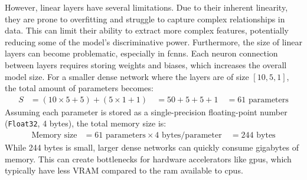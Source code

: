 However, linear layers have several limitations. Due to their inherent linearity, they are prone to overfitting and struggle to capture complex relationships in data. This can limit their ability to extract more complex features, potentially reducing some of the model's discriminative power. Furthermore, the size of linear layers can become problematic, especially in \acrshort{fcnn}s. Each neuron connection between layers requires storing weights and biases, which increases the overall model size. For a smaller dense network where the layers are of size $[10, 5, 1]$, the total amount of parameters becomes:
$$\begin{aligned}
S &= (10 \times 5 + 5) + (5 \times 1 + 1) \
&= 50 + 5 + 5 + 1 \
&= 61 \text{ parameters}
\end{aligned}$$
Assuming each parameter is stored as a single-precision floating-point number (\texttt{Float32}, 4 bytes), the total memory size is:
$$\begin{aligned}
\text{Memory size} &= 61 \text{ parameters} \times 4 \text{ bytes/parameter} \
&= 244 \text{ bytes}
\end{aligned}$$ While 244 bytes is small, larger dense networks can quickly consume gigabytes of memory. This can create bottlenecks for hardware accelerators like \acrshort{gpu}s, which typically have less VRAM compared to the \acrshort{ram} available to \acrshort{cpu}s.
